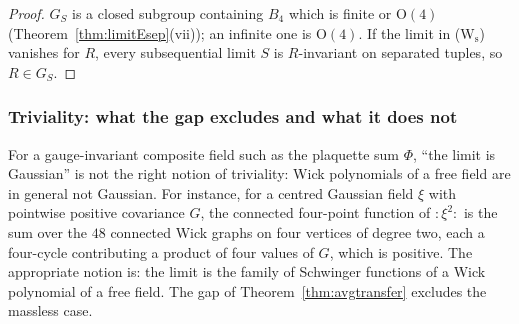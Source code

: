 \begin{proof}
$G_S$ is a closed subgroup containing $B_4$ which is finite or $\mathrm O(4)$
(Theorem~\ref{thm:limitEsep}(vii)); an infinite one is $\mathrm O(4)$. If the
limit in (W$_{\mathrm s}$) vanishes for $R$, every subsequential limit $S$ is
$R$-invariant on separated tuples, so $R\in G_S$.
\end{proof}

\subsubsection{Triviality: what the gap excludes and what it does not}

For a gauge-invariant composite field such as the plaquette sum $\Phi$,
``the limit is Gaussian'' is not the right notion of triviality: Wick
polynomials of a free field are in general not Gaussian. For instance, for a
centred Gaussian field $\xi$ with pointwise positive covariance $G$, the
connected four-point function of ${:}\xi^2{:}$ is the sum over the $48$
connected Wick graphs on four vertices of degree two, each a four-cycle
contributing a product of four values of $G$, which is positive. The
appropriate notion is: the limit is the family of Schwinger functions of a
Wick polynomial of a free field. The gap of Theorem~\ref{thm:avgtransfer}
excludes the massless case.

